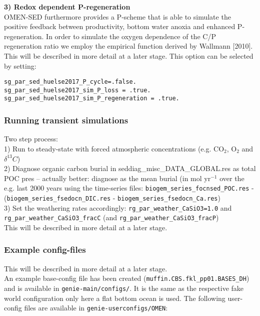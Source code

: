\documentclass[11pt,fleqn]{book} %
\begin{document}
\vspace{1mm}
\noindent
\textbf{3) Redox dependent P-regeneration}\\
OMEN-SED furthermore provides a P-scheme that is able to simulate the positive feedback between productivity, bottom water anoxia and enhanced P-regeneration. In order to simulate the oxygen dependence of the C/P regeneration ratio we employ the
empirical function derived by Wallmann [2010]. This will be described in more detail at a later stage. This option can be selected by setting:
\vspace{-2mm}\begin{verbatim}
sg_par_sed_huelse2017_P_cycle=.false.
sg_par_sed_huelse2017_sim_P_loss = .true.
sg_par_sed_huelse2017_sim_P_regeneration = .true.
\end{verbatim}\vspace{-2mm}

%
\subsubsection*{Running transient simulations}
Two step process:\\
1) Run to steady-state with forced atmospheric concentrations (e.g. CO$_2$, O$_2$ and \(\delta^{13}C\))\\
2) Diagnose organic carbon burial in seddiag\_misc\_DATA\_GLOBAL.res as total POC pres -- actually better: diagnose as the mean burial (in mol yr$^{-1}$ over the e.g. last 2000 years using the time-series files:
 \texttt{biogem\_series\_focnsed\_POC.res} - (\texttt{biogem\_series\_fsedocn\_DIC.res} - \texttt{biogem\_series\_fsedocn\_Ca.res})\\
3) Set the weathering rates accordingly: \texttt{rg\_par\_weather\_CaSiO3=1.0} and \texttt{rg\_par\_weather\_CaSiO3\_fracC} (and \texttt{rg\_par\_weather\_CaSiO3\_fracP})\\
This will be described in more detail at a later stage.

%
\subsubsection*{Example config-files}
This will be described in more detail at a later stage.\\
An example base-config file has been created (\texttt{muffin.CBS.fkl\_pp01.BASES\_DH}) and is available in \texttt{genie-main/configs/}. It is the same as the respective fake world configuration only here a flat bottom ocean is used. The following
user-config files are available in \texttt{genie-userconfigs/OMEN}:\\
\end{document}
